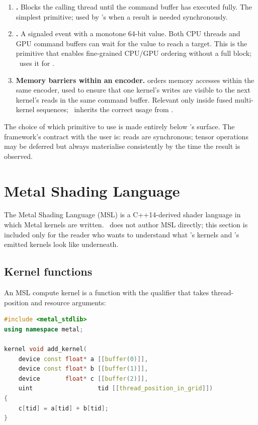 \begin{enumerate}
  \item \textbf{.}
    Blocks the calling thread until the command buffer has executed
    fully. The simplest primitive; used by \MLX's  when
    a result is needed synchronously.
  \item \textbf{.} A signaled event with a
    monotone 64-bit value. Both CPU threads and GPU command buffers
    can wait for the value to reach a target. This is the primitive
    that enables fine-grained CPU/GPU ordering without a full
    block; \MLX\ uses it for .
  \item \textbf{Memory barriers within an encoder.}
     orders memory
    accesses within the same encoder, used to ensure that one
    kernel's writes are visible to the next kernel's reads in the
    same command buffer. Relevant only inside fused multi-kernel
    sequences; \Lucid\ inherits the correct usage from \MPSGraph.
\end{enumerate}

The choice of which primitive to use is made entirely below
\Lucid's surface. The framework's contract with the user is:
 reads are synchronous; tensor operations may be
deferred but always materialise consistently by the time the result
is observed.

\section{Metal Shading Language}
\label{sec:metal_mpsgraph:msl}

The Metal Shading Language (MSL) is a C++14-derived shader language
in which Metal kernels are written. \Lucid\ does not author MSL
directly; this section is included only for the reader who wants to
understand what \MLX's kernels and \MPSGraph's emitted kernels look
like underneath.

\subsection{Kernel functions}
\label{ssec:metal_mpsgraph:kernels}

An MSL compute kernel is a function with the  qualifier
that takes thread-position and resource arguments:

\begin{lstlisting}[style=lucidcpp,language=C++]
#include <metal_stdlib>
using namespace metal;

kernel void add_kernel(
    device const float* a [[buffer(0)]],
    device const float* b [[buffer(1)]],
    device       float* c [[buffer(2)]],
    uint                  tid [[thread_position_in_grid]])
{
    c[tid] = a[tid] + b[tid];
}
\end{lstlisting}

